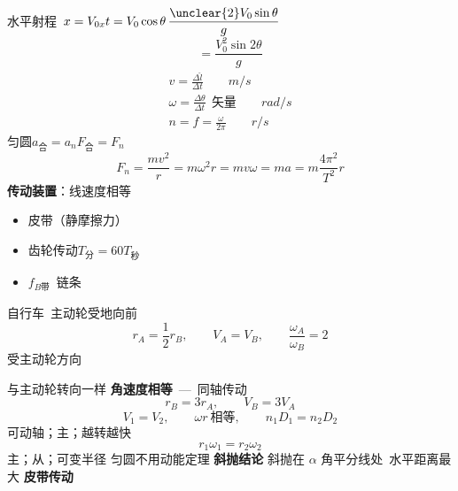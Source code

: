 水平射程\ $x=V_{0x}t=V_0\cos\theta\,\dfrac{\unclear{2}V_0\sin\theta}{g}$ %
\[
=\frac{V_0^2\sin2\theta}{g}
\]
\begin{gather*}
v=\frac{\Delta\widehat{l}}{\Delta t}\qquad \unit{m/s}\\
\omega=\frac{\Delta\theta}{\Delta t}\ \ \text{矢量}\qquad \unit{rad/s}\\
n=f=\frac{\omega}{2\pi}\qquad \unit{r/s}
\end{gather*}
匀圆\quad $a_{\text{合}}=a_n$\quad $F_{\text{合}}=F_n$
\[ F_n=\frac{mv^2}{r}=m\omega^2 r=mv\omega=ma=m\frac{4\pi^2}{T^2}r \]
\textbf{传动装置}：线速度相等
\begin{itemize}
\item 皮带（静摩擦力）
\item 齿轮传动\quad $T_{\text{分}}=60T_{\text{秒}}$\quad {}
\item $f_{B\text{带}}$\ 链条
\end{itemize}
自行车\ 主动轮\quad 受地向前
\[ r_A=\frac{1}{2}r_B,\qquad V_A=V_B,\qquad \frac{\omega_A}{\omega_B}=2 \]
受主动轮方向\par
与主动轮转向一样
\textbf{角速度相等}\ —\ 同轴传动
\[ r_B=3r_A,\qquad V_B=3V_A \]
\[ V_1=V_2,\qquad \omega r\ \text{相等},\qquad n_1D_1=n_2D_2 \]
可动轴；主；越转越快
\[ r_1\omega_1=r_2\omega_2 \]
主；从；可变半径
匀圆不用动能定理
\textbf{斜抛结论}
斜抛在 $\alpha$ 角平分线处\ 水平距离最大
\textbf{皮带传动}

